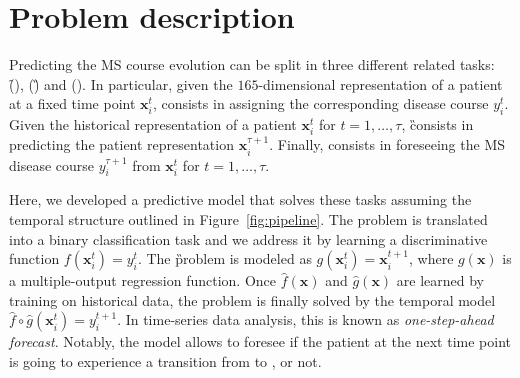 
\section{Problem description}\label{sec:problem_description}

Predicting the MS course evolution can be split in three different related tasks: \f (\F), \g (\G) and \fog (\FOG).
In particular, given the $165$-dimensional representation of a patient at a fixed time point $\bm{x}_i^t$, \F consists in assigning the corresponding disease course $y_i^t$. Given the historical representation  of a patient $\bm{x}_i^t$ for $t=1,\dots,\tau$, \G consists in predicting the patient representation $\bm{x}_i^{\tau+1}$.
Finally, \FOG consists in foreseeing the MS disease course $y_i^{\tau+1}$ from $\bm{x}_i^t$ for $t=1,\dots,\tau$.
%

%
Here, we developed a predictive model that solves these tasks assuming the temporal structure outlined in Figure~\ref{fig:pipeline}.
The \F problem is translated into a binary classification task and we address it by learning a discriminative function $f(\bm{x}_i^{t}) = y_i^{t}$. The \G problem is modeled as $g(\bm{x}_i^{t}) = \bm{x}_i^{t+1}$, where $g(\bm{x})$ is a multiple-output regression function.
Once $\hat{f}(\bm{x})$ and $\hat{g}(\bm{x})$ are learned by training on historical \PCO data, the \FOG problem is finally solved by the temporal model $\hat{f} \circ \hat{g}(\bm{x}_i^{t}) = y_i^{t+1}$. In time-series data analysis, this is known as \textit{one-step-ahead forecast}. Notably, the \FOG model allows to foresee if the patient at the next time point is going to experience a transition from \RR to \SP, or not.

